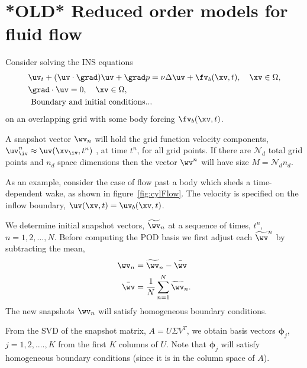 \documentclass[11pt]{article}
\newcommand{\phiv}{\boldsymbol{\phi}}
\newcommand{\Nc}{{\mathcal N}}
\begin{document}
\clearpage
\section{*OLD* Reduced order models for fluid flow}

Consider solving the INS equations
\begin{align}
  & \uv_t + (\uv\cdot\grad)\uv + \grad p = \nu \Delta \uv + \fv_b(\xv,t) , \quad \xv \in\Omega,  \label{eq:NSu}\\
  & \grad\cdot\uv = 0 , \quad \xv \in\Omega,  \\
  & \text{ Boundary and initial conditions...}
\end{align}
on an overlapping grid with some body forcing $\fv_b(\xv,t)$.

A snapshot vector $\wv_n$ will hold the grid function velocity components, $\uv_\iv^n\approx \uv(\xv_\iv,t^n)$ ,  at time $t^n$,
for all grid points. If there are $\Nc_d$ total grid points and $n_d$ space dimensions then the vector $\wv^n$ will
have size $M=\Nc_d n_d$.



As an example, consider the case of flow past a body which sheds a time-dependent wake, as shown
in figure~\ref{fig:cylFlow}. The velocity is specified on the inflow boundary, $\uv(\xv,t)=\uv_b(\xv,t)$.

We determine initial snapshot vectors, $\wvTilde_n$ at a sequence of times, $t^n$, $n=1,2,\ldots,N$. 
Before computing the POD basis we first adjust each $\wvTilde^n$ by subtracting the mean,
\begin{align}
   \wv_n &= \wvTilde_n - \wvBar \\
   \wvBar &= \frac{1}{N} \sum_{n=1}^N \wvTilde_n . 
\end{align}
The new snapshots $\wv_n$ will satisfy homogeneous boundary conditions.


From the SVD of the snapshot matrix, $A=U\Sigma V^T$, we obtain basis vectors $\phiv_j$, $j=1,2,.\ldots,K$ from
the first $K$ columns of $U$. Note that $\phiv_j$ will satisfy homogeneous boundary conditions (since it is in the column space
of $A$). 
\end{document}
